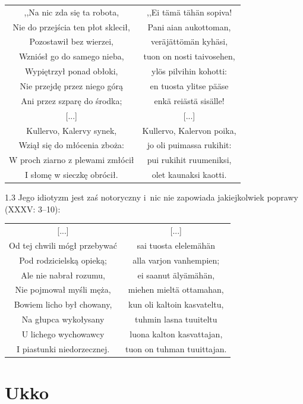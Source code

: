 \documentclass[11pt,a4paper,twoside]{report}
\begin{document}
{\centering
\small
\begin{longtable}{c c}
,,Na nic zda się ta robota, & ,,Ei tämä tähän sopiva! \\
Nie do przejścia ten płot sklecił, & Pani aian aukottoman, \\
Pozostawił bez wierzei, & veräjättömän kyhäsi, \\
Wzniósł go do samego nieba, & tuon on nosti taivosehen, \\
Wypiętrzył ponad obłoki, & ylös pilvihin kohotti: \\
Nie przejdę przez niego górą & en tuosta ylitse pääse \\
Ani przez szparę do środka; & enkä reiästä sisälle! \\
{[...]} & {[...]} \\
Kullervo, Kalervy synek, & Kullervo, Kalervon poika, \\
Wziął się do młócenia zboża: & jo oli puimassa rukihit: \\
W proch ziarno z plewami zmłócił & pui rukihit ruumeniksi, \\
I słomę w sieczkę obrócił. & olet kaunaksi kaotti. \\
\end{longtable}
}
\begin{spacing}{1.3}
Jego idiotyzm jest zaś notoryczny i~nic nie zapowiada jakiejkolwiek poprawy (XXXV: 3--10):
\end{spacing}
{\centering
\small
\begin{longtable}{c c}
{[...]} & {[...]} \\
Od tej chwili mógł przebywać & sai tuosta elelemähän \\
Pod rodzicielską opieką; & alla varjon vanhempien; \\
Ale nie nabrał rozumu, & ei saanut älyämähän, \\
Nie pojmował myśli męża, & miehen mieltä ottamahan, \\
Bowiem licho był chowany, & kun oli kaltoin kasvateltu, \\
Na głupca wykołysany & tuhmin lasna tuuiteltu \\
U lichego wychowawcy & luona kalton kasvattajan, \\
I piastunki niedorzecznej. & tuon on tuhman tuuittajan. \\
\end{longtable}
}
\vspace*{\baselineskip}
\section{Ukko}
\vspace*{0.5\baselineskip}
\end{document}
